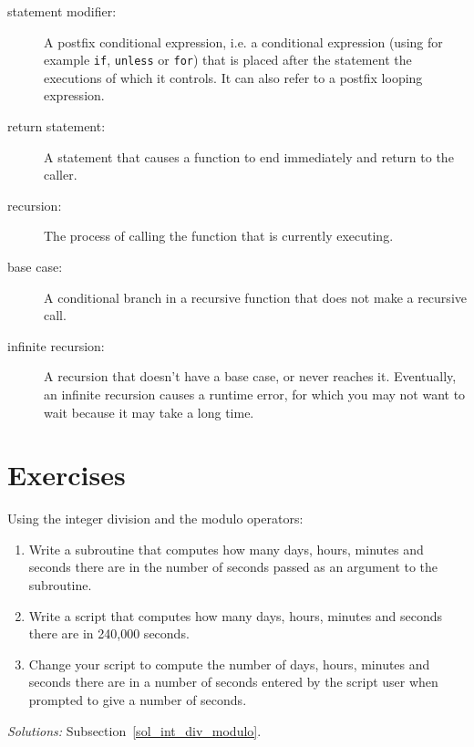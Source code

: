 \begin{description}
\item[statement modifier:] A postfix conditional expression, i.e. 
a conditional expression (using for example {\tt if}, {\tt unless} or 
{\tt for}) that is placed after the statement the executions of which 
it controls. It can also refer to a postfix looping expression.

\item[return statement:] A statement that causes a function to
end immediately and return to the caller.

\item[recursion:]  The process of calling the function that is
currently executing.

\item[base case:]  A conditional branch in a
recursive function that does not make a recursive call.

\item[infinite recursion:]  A recursion that doesn't have a
base case, or never reaches it.  Eventually, an infinite 
recursion causes a runtime error, for which you may not want 
to wait because it may take a long time.

\end{description}

\section{Exercises}
%

\begin{exercise}
%
Using the integer division and the modulo operators:
\label{int_div_modulo}

\begin{enumerate}

\item Write a subroutine that computes how many days, hours, minutes and seconds there are in the number of seconds passed as an argument to the subroutine.

\item Write a script that computes how many days, hours, minutes and seconds there are in 240,000 seconds.

\item Change your script to compute the number of days, hours, minutes and seconds there are in a number of seconds entered by the script user when prompted to give a number of seconds.

\end{enumerate}

\emph{Solutions:} Subsection~\ref{sol_int_div_modulo}.

\end{exercise}


